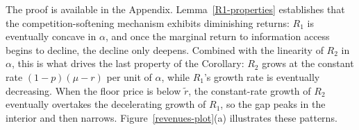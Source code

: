 \documentclass[11pt]{article}
\theoremstyle{plain}
\theoremstyle{definition}
\theoremstyle{plain}
\theoremstyle{plain}
\theoremstyle{plain}
\theoremstyle{plain}
\numberwithin{equation}{section}
\begin{document}
\noindent The proof is available in the Appendix. Lemma~\ref{R1-properties} establishes that the competition-softening mechanism exhibits diminishing returns: $R_1$ is eventually concave in $\alpha$, and once the marginal return to information access begins to decline, the decline only deepens. Combined with the linearity of $R_2$ in $\alpha$, this is what drives the last property of the Corollary: $R_2$ grows at the constant rate $(1-p)(\mu - r)$ per unit of $\alpha$, while $R_1$'s growth rate is eventually decreasing. When the floor price is below $\tilde{r}$, the constant-rate growth of $R_2$ eventually overtakes the decelerating growth of $R_1$, so the gap peaks in the interior and then narrows. Figure~\ref{revenues-plot}(a) illustrates these patterns.

\vspace{0.4cm}
\end{document}
